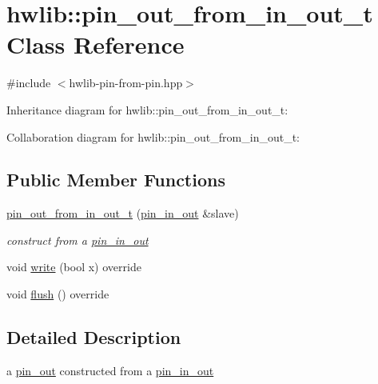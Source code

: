 \hypertarget{classhwlib_1_1pin__out__from__in__out__t}{}\section{hwlib\+:\+:pin\+\_\+out\+\_\+from\+\_\+in\+\_\+out\+\_\+t Class Reference}
\label{classhwlib_1_1pin__out__from__in__out__t}


{\ttfamily \#include $<$hwlib-\/pin-\/from-\/pin.\+hpp$>$}



Inheritance diagram for hwlib\+:\+:pin\+\_\+out\+\_\+from\+\_\+in\+\_\+out\+\_\+t\+:


Collaboration diagram for hwlib\+:\+:pin\+\_\+out\+\_\+from\+\_\+in\+\_\+out\+\_\+t\+:
\subsection*{Public Member Functions}
\begin{DoxyCompactItemize}
\item 
\mbox{\label{classhwlib_1_1pin__out__from__in__out__t_a23c4b3e64953334f291002307317fc49}} 
\hyperlink{classhwlib_1_1pin__out__from__in__out__t_a23c4b3e64953334f291002307317fc49}{pin\+\_\+out\+\_\+from\+\_\+in\+\_\+out\+\_\+t} (\hyperlink{classhwlib_1_1pin__in__out}{pin\+\_\+in\+\_\+out} \&slave)
\begin{DoxyCompactList}\small\item\em construct from a \hyperlink{classhwlib_1_1pin__in__out}{pin\+\_\+in\+\_\+out} \end{DoxyCompactList}\item 
void \hyperlink{classhwlib_1_1pin__out__from__in__out__t_a6171cefa50ff9db91e17eb6e1d8a3d74}{write} (bool x) override
\item 
void \hyperlink{classhwlib_1_1pin__out__from__in__out__t_a7b2e19b1916d922557ab2881b92085f3}{flush} () override
\end{DoxyCompactItemize}


\subsection{Detailed Description}
a \hyperlink{classhwlib_1_1pin__out}{pin\+\_\+out} constructed from a \hyperlink{classhwlib_1_1pin__in__out}{pin\+\_\+in\+\_\+out}

